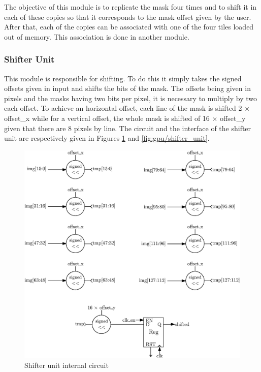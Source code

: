 The objective of this module is to replicate the mask four times and to shift it in each of these 
copies so that it corresponds to the mask offset given by the user. After that, each of the copies 
can be associated with one of the four tiles loaded out of memory. This association is done in 
another module.

\subsubsection*{Shifter Unit}

This module is responsible for shifting. To do this it simply takes the signed 
offsets given in input and shifts the bits of the mask. The offsets being given in pixels and the
masks having two bits per pixel, it is necessary to multiply by two each offset. To achieve an 
horizontal offset, each line of the mask is shifted 2 $\times$ offset\_x while for a vertical offset, the whole mask is shifted of 16 $\times$ offset\_y given that there are 8 pixels 
by line. The circuit and the interface of the shifter unit are respectively given in Figures
\ref{fig:gpu/shifter_unit_in} and \ref{fig:gpu/shifter_unit}.

\begin{figure}[H]
    \centering
    \includegraphics[width=\linewidth]{Chapter4-GPU_CLKU/res/shifter_unit_in}
    \caption{Shifter unit internal circuit}
    \label{fig:gpu/shifter_unit_in}
\end{figure}

